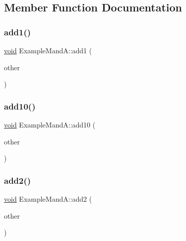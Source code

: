 \subsection{Member Function Documentation}
\mbox{\label{class_example_mand_a_a6ccf6ab9f7ef3396f543bc04737533a5}} 
\subsubsection{\texorpdfstring{add1()}{add1()}}
{\footnotesize\ttfamily \mbox{\hyperlink{_s_d_l__opengles2__gl2ext_8h_ae5d8fa23ad07c48bb609509eae494c95}{void}} Example\+Mand\+A\+::add1 (\begin{DoxyParamCaption}\item[{\mbox{\hyperlink{class_example_mand_a}{Example\+MandA}}}]{other }\end{DoxyParamCaption})\hspace{0.3cm}{\ttfamily [inline]}}

\mbox{\label{class_example_mand_a_ae92e98463523127b13b545452c4e7b77}} 
\subsubsection{\texorpdfstring{add10()}{add10()}}
{\footnotesize\ttfamily \mbox{\hyperlink{_s_d_l__opengles2__gl2ext_8h_ae5d8fa23ad07c48bb609509eae494c95}{void}} Example\+Mand\+A\+::add10 (\begin{DoxyParamCaption}\item[{const \mbox{\hyperlink{warnings_8h_a74f207b5aa4ba51c3a2ad59b219a423b}{int}} $\ast$}]{other }\end{DoxyParamCaption})\hspace{0.3cm}{\ttfamily [inline]}}

\mbox{\label{class_example_mand_a_a706ef1745f2cc814657df479666b0e3e}} 
\subsubsection{\texorpdfstring{add2()}{add2()}}
{\footnotesize\ttfamily \mbox{\hyperlink{_s_d_l__opengles2__gl2ext_8h_ae5d8fa23ad07c48bb609509eae494c95}{void}} Example\+Mand\+A\+::add2 (\begin{DoxyParamCaption}\item[{\mbox{\hyperlink{class_example_mand_a}{Example\+MandA}} \&}]{other }\end{DoxyParamCaption})\hspace{0.3cm}{\ttfamily [inline]}}

